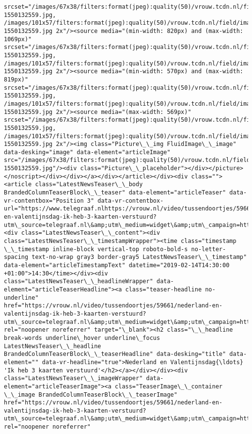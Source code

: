 \documentclass[11pt]{article}
\begin{document}
\begin{Verbatim}[commandchars=\\\{\}]
srcset="/images/67x38/filters:format(jpeg):quality(50)/vrouw.tcdn.nl/field/image/ff0c78973b872ffd2d689f9c4e7e9ba5-1550132559.jpg, /images/101x57/filters:format(jpeg):quality(50)/vrouw.tcdn.nl/field/image/ff0c78973b872ffd2d689f9c4e7e9ba5-1550132559.jpg 2x"/><source media="(min-width: 820px) and (max-width: 1069px)" srcset="/images/67x38/filters:format(jpeg):quality(50)/vrouw.tcdn.nl/field/image/ff0c78973b872ffd2d689f9c4e7e9ba5-1550132559.jpg, /images/101x57/filters:format(jpeg):quality(50)/vrouw.tcdn.nl/field/image/ff0c78973b872ffd2d689f9c4e7e9ba5-1550132559.jpg 2x"/><source media="(min-width: 570px) and (max-width: 819px)" srcset="/images/67x38/filters:format(jpeg):quality(50)/vrouw.tcdn.nl/field/image/ff0c78973b872ffd2d689f9c4e7e9ba5-1550132559.jpg, /images/101x57/filters:format(jpeg):quality(50)/vrouw.tcdn.nl/field/image/ff0c78973b872ffd2d689f9c4e7e9ba5-1550132559.jpg 2x"/><source media="(max-width: 569px)" srcset="/images/67x38/filters:format(jpeg):quality(50)/vrouw.tcdn.nl/field/image/ff0c78973b872ffd2d689f9c4e7e9ba5-1550132559.jpg, /images/101x57/filters:format(jpeg):quality(50)/vrouw.tcdn.nl/field/image/ff0c78973b872ffd2d689f9c4e7e9ba5-1550132559.jpg 2x"/><img class="Picture\_\_img FluidImage\_\_image" data-desking="image" data-element="articleImage" src="/images/67x38/filters:format(jpeg):quality(50)/vrouw.tcdn.nl/field/image/ff0c78973b872ffd2d689f9c4e7e9ba5-1550132559.jpg"/><div class="Picture\_\_placeholder"></div></picture></noscript></div></div></a></div></article></div><div class=""><article class="LatestNewsTeaser\_\_body BrandedColumnTeaserBlock\_\_teaser" data-element="articleTeaser" data-vr-contentbox="Position 3" data-vr-contentbox-url="https://www.telegraaf.nlhttps://vrouw.nl/video/tussendoortjes/59661/nederland-en-valentijnsdag-ik-heb-3-kaarten-verstuurd?utm\_source=telegraaf.nl\&amp;utm\_medium=widget\&amp;utm\_campaign=https://www.telegraaf.nl/"><div class="LatestNewsTeaser\_\_content"><div class="LatestNewsTeaser\_\_timestampWrapper"><time class="timestamp \_\_timestamp inline-block vertical-top roboto-bold-s no-letter-spacing text-no-wrap gray3 border-gray5 LatestNewsTeaser\_\_timestamp" data-element="articleTimestampText" datetime="2019-02-14T14:30:00 +01:00">14:30</time></div><div class="LatestNewsTeaser\_\_headlineWrapper" data-element="articleTeaserHeadline"><a class="teaser-headline no-underline" href="https://vrouw.nl/video/tussendoortjes/59661/nederland-en-valentijnsdag-ik-heb-3-kaarten-verstuurd?utm\_source=telegraaf.nl\&amp;utm\_medium=widget\&amp;utm\_campaign=https://www.telegraaf.nl/" rel="noopener noreferrer" target="\_blank"><h2 class="\_\_headline break-words underline\_hover underline\_focus LatestNewsTeaser\_\_headline BrandedColumnTeaserBlock\_\_teaserHeadline" data-desking="title" data-element="" data-vr-headline="true">Nederland en Valentijnsdag{\ldots} 'Ik heb 3 kaarten verstuurd'</h2></a></div></div><div class="LatestNewsTeaser\_\_imageWrapper" data-element="articleTeaserImage"><a class="TeaserImage\_\_container \_\_image BrandedColumnTeaserBlock\_\_teaserImage" href="https://vrouw.nl/video/tussendoortjes/59661/nederland-en-valentijnsdag-ik-heb-3-kaarten-verstuurd?utm\_source=telegraaf.nl\&amp;utm\_medium=widget\&amp;utm\_campaign=https://www.telegraaf.nl/" rel="noopener noreferrer" 
\end{Verbatim}
\end{document}
